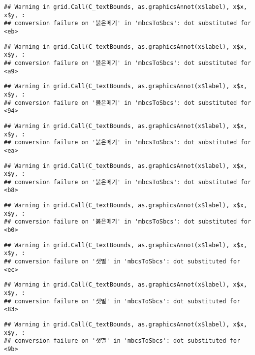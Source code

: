 \documentclass[
]{article}
\begin{document}
\begin{verbatim}
## Warning in grid.Call(C_textBounds, as.graphicsAnnot(x$label), x$x, x$y, :
## conversion failure on '붉은메기' in 'mbcsToSbcs': dot substituted for <eb>
\end{verbatim}

\begin{verbatim}
## Warning in grid.Call(C_textBounds, as.graphicsAnnot(x$label), x$x, x$y, :
## conversion failure on '붉은메기' in 'mbcsToSbcs': dot substituted for <a9>
\end{verbatim}

\begin{verbatim}
## Warning in grid.Call(C_textBounds, as.graphicsAnnot(x$label), x$x, x$y, :
## conversion failure on '붉은메기' in 'mbcsToSbcs': dot substituted for <94>
\end{verbatim}

\begin{verbatim}
## Warning in grid.Call(C_textBounds, as.graphicsAnnot(x$label), x$x, x$y, :
## conversion failure on '붉은메기' in 'mbcsToSbcs': dot substituted for <ea>
\end{verbatim}

\begin{verbatim}
## Warning in grid.Call(C_textBounds, as.graphicsAnnot(x$label), x$x, x$y, :
## conversion failure on '붉은메기' in 'mbcsToSbcs': dot substituted for <b8>
\end{verbatim}

\begin{verbatim}
## Warning in grid.Call(C_textBounds, as.graphicsAnnot(x$label), x$x, x$y, :
## conversion failure on '붉은메기' in 'mbcsToSbcs': dot substituted for <b0>
\end{verbatim}

\begin{verbatim}
## Warning in grid.Call(C_textBounds, as.graphicsAnnot(x$label), x$x, x$y, :
## conversion failure on '샛멸' in 'mbcsToSbcs': dot substituted for <ec>
\end{verbatim}

\begin{verbatim}
## Warning in grid.Call(C_textBounds, as.graphicsAnnot(x$label), x$x, x$y, :
## conversion failure on '샛멸' in 'mbcsToSbcs': dot substituted for <83>
\end{verbatim}

\begin{verbatim}
## Warning in grid.Call(C_textBounds, as.graphicsAnnot(x$label), x$x, x$y, :
## conversion failure on '샛멸' in 'mbcsToSbcs': dot substituted for <9b>
\end{verbatim}
\end{document}
